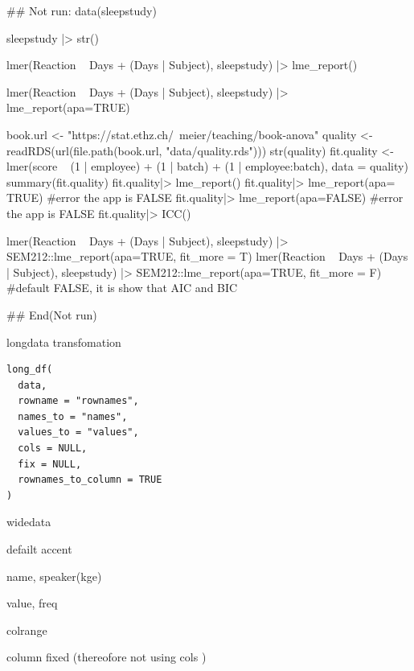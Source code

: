 \documentclass[a4paper]{book}
\begin{document}
%
\begin{Examples}
\begin{ExampleCode}
\#\# Not run: 
data(sleepstudy)

sleepstudy |> str()

lmer(Reaction ~ Days + (Days | Subject), sleepstudy) |> lme_report()

lmer(Reaction ~ Days + (Days | Subject), sleepstudy) |> lme_report(apa=TRUE)


book.url <- "https://stat.ethz.ch/~meier/teaching/book-anova"
quality <- readRDS(url(file.path(book.url, "data/quality.rds")))
str(quality)
fit.quality <- lmer(score ~ (1 | employee) + (1 | batch) +
                     (1 | employee:batch), data = quality)
summary(fit.quality)
fit.quality|> lme_report()
fit.quality|> lme_report(apa= TRUE) #error the app is FALSE
fit.quality|> lme_report(apa=FALSE) #error the app is FALSE
fit.quality|> ICC()

lmer(Reaction ~ Days + (Days | Subject), sleepstudy) |>
SEM212::lme_report(apa=TRUE, fit_more = T)
lmer(Reaction ~ Days + (Days | Subject), sleepstudy) |>
SEM212::lme_report(apa=TRUE, fit_more = F)  #default FALSE, it is show that AIC and BIC


## End(Not run)

\end{ExampleCode}
\end{Examples}
%
\begin{Description}
longdata transfomation
\end{Description}
%
\begin{Usage}
\begin{verbatim}
long_df(
  data,
  rowname = "rownames",
  names_to = "names",
  values_to = "values",
  cols = NULL,
  fix = NULL,
  rownames_to_column = TRUE
)
\end{verbatim}
\end{Usage}
%
\begin{Arguments}
\begin{ldescription}
\item[\code{data}] widedata

\item[\code{rowname}] defailt accent

\item[\code{names\_to}] name, speaker(kge)

\item[\code{values\_to}] value, freq

\item[\code{cols}] colrange

\item[\code{fix}] column fixed (thereofore not using cols )
\end{ldescription}
\end{Arguments}
\end{document}
